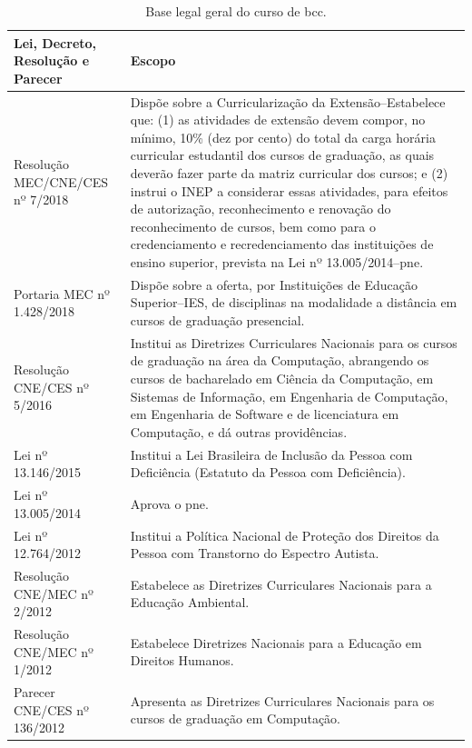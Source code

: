 \documentclass[
	12pt,				%
	openright,			%
  oneside,     %
	a4paper,			%
 hyphens,
	chapter=TITLE,		%
	english,			%
	french,				%
	spanish,			%
	brazil				%
	]{abntex2}
\begin{document}
\begin{center}
    
    \begin{scriptsize}
        \begin{longtable}{p{5.8cm}p{9cm}}
            \caption{\label{quadro:base-legal-geral-curso}Base legal geral do curso de \acrlong{bcc}.}\\
    \toprule
    \textbf{Lei, Decreto, Resolução e Parecer} & \textbf{Escopo} \\ 
    \midrule
    Resolução MEC/CNE/CES nº 7/2018 & Dispõe sobre a Curricularização da Extensão--Estabelece que: (1) as atividades de extensão devem compor, no mínimo, 10\% (dez por cento) do total da carga horária curricular estudantil dos cursos de graduação, as quais deverão fazer parte da matriz curricular dos cursos; e (2) instrui o INEP a considerar essas atividades, para efeitos de autorização, reconhecimento e renovação do reconhecimento de cursos, bem como para o credenciamento e recredenciamento das instituições de ensino superior, prevista na Lei nº 13.005/2014--\acrfull{pne}. \\ \midrule
    Portaria MEC nº 1.428/2018	& Dispõe sobre a oferta, por Instituições de Educação Superior--IES, de disciplinas na modalidade a distância em cursos de graduação presencial. \\ \midrule
    Resolução CNE/CES nº 5/2016	& Institui as Diretrizes Curriculares Nacionais para os cursos de graduação na área da Computação, abrangendo os cursos de bacharelado em Ciência da Computação, em Sistemas de Informação, em Engenharia de Computação, em Engenharia de Software e de licenciatura em Computação, e dá outras providências.\\ \midrule
    Lei nº 13.146/2015 & Institui a Lei Brasileira de Inclusão da Pessoa com Deficiência (Estatuto da Pessoa com Deficiência). \\ \midrule
    Lei nº 13.005/2014	& Aprova o \acrshort{pne}. \\ \midrule
    Lei nº 12.764/2012 & Institui a Política Nacional de Proteção dos Direitos da Pessoa com Transtorno do Espectro Autista. \\ \midrule
    Resolução CNE/MEC nº 2/2012 & Estabelece as Diretrizes Curriculares Nacionais para a Educação Ambiental. \\ \midrule
    Resolução CNE/MEC nº 1/2012 & Estabelece Diretrizes Nacionais para a Educação em Direitos Humanos.\\ \midrule
    Parecer CNE/CES nº 136/2012	& Apresenta as Diretrizes Curriculares Nacionais para os cursos de graduação em Computação. \\ \midrule

\end{longtable}
\end{scriptsize}
\end{center}
\end{document}
